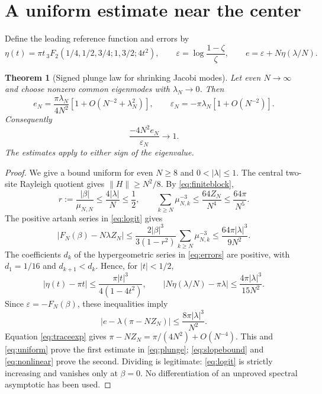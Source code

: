 \documentclass[10pt]{article}
\newtheorem{theorem}{Theorem}
\begin{document}
\section{A uniform estimate near the center}
Define the leading reference function and errors by
\begin{equation}
\eta(t)=\pi t\,{}_3F_2(1/4,1/2,3/4;1,3/2;4t^2),\qquad
\varepsilon=\log\frac{1-\zeta}{\zeta},\qquad
e=\varepsilon+N\eta(\lambda/N).
\label{eq:errors}
\end{equation}
\begin{theorem}[Signed plunge law for shrinking Jacobi modes]
Let even $N\to\infty$ and choose nonzero common eigenmodes with
$\lambda_N\to0$. Then
\begin{equation}
e_N=\frac{\pi\lambda_N}{4N^2}
\left[1+O(N^{-2}+\lambda_N^2)\right],\qquad
\varepsilon_N=-\pi\lambda_N\left[1+O(N^{-2})\right].
\label{eq:plunge}
\end{equation}
Consequently
\begin{equation}
\boxed{\quad\frac{-4N^2e_N}{\varepsilon_N}\longrightarrow1.\quad}
\label{eq:ratio}
\end{equation}
The estimates apply to either sign of the eigenvalue.
\end{theorem}
\begin{proof}
We give a bound uniform for even $N\ge8$ and $0<|\lambda|\le1$.
The central two-site Rayleigh quotient gives $\|H\|\ge N^2/8$.
By \eqref{eq:finiteblock},
\[
r:=\frac{|\beta|}{\mu_{N,N}}\le\frac{4|\lambda|}{N}\le\frac12,
\qquad
\sum_{k\ge N}\mu_{N,k}^{-3}
\le\frac{64Z_N}{N^4}\le\frac{64\pi}{N^5}.
\]
The positive artanh series in \eqref{eq:logit} gives
\begin{equation}
|F_N(\beta)-N\lambda Z_N|
\le\frac{2|\beta|^3}{3(1-r^2)}\sum_{k\ge N}\mu_{N,k}^{-3}
\le\frac{64\pi|\lambda|^3}{9N^2}.
\label{eq:nonlinear}
\end{equation}
The coefficients $d_k$ of the hypergeometric series in \eqref{eq:errors}
are positive, with $d_1=1/16$ and $d_{k+1}<d_k$.
Hence, for $|t|<1/2$,
\[
|\eta(t)-\pi t|\le\frac{\pi|t|^3}{4(1-4t^2)},
\qquad
|N\eta(\lambda/N)-\pi\lambda|
\le\frac{4\pi|\lambda|^3}{15N^2}.
\]
Since $\varepsilon=-F_N(\beta)$, these inequalities imply
\begin{equation}
|e-\lambda(\pi-NZ_N)|\le\frac{8\pi|\lambda|^3}{N^2}.
\label{eq:uniform}
\end{equation}
Equation \eqref{eq:traceexp} gives
$\pi-NZ_N=\pi/(4N^2)+O(N^{-4})$.
This and \eqref{eq:uniform} prove the first estimate in
\eqref{eq:plunge}; \eqref{eq:slopebound} and
\eqref{eq:nonlinear} prove the second. Dividing is legitimate:
\eqref{eq:logit} is strictly increasing and vanishes only at $\beta=0$.
No differentiation of an unproved spectral asymptotic has been used.
\end{proof}
\end{document}
